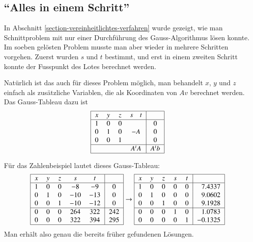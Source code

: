%
%
\subsection{``Alles in einem Schritt''}
In Abschnitt \ref{section-vereinheitlichtes-verfahren} wurde gezeigt,
wie man Schnittproblem mit nur einer Durchführung des Gauss-Algorithmus
lösen konnte.
Im soeben gelösten Problem musste man aber wieder
in mehrere Schritten vorgehen.
Zuerst wurden $s$ und $t$ bestimmt,
und erst in einem zweiten Schritt konnte der Fusspunkt des Lotes
berechnet werden.

Natürlich ist das auch für dieses Problem möglich, man behandelt
$x$, $y$ und $z$ einfach als zusätzliche Variablen, die als Koordinaten
von $Av$ berechnet werden.
Das Gauss-Tableau dazu ist
\[
\begin{tabular}{|>{$}c<{$}>{$}c<{$}>{$}c<{$}>{$}c<{$}|>{$}c<{$}|}
\hline
x&y&z&s\quad t&\\
\hline
1&0&0&        &0\\
0&1&0&-A   &0\\
0&0&1&        &0\\
\hline
 & & &A^tA    &A^tb\\
\hline
\end{tabular}
\]
\begin{beispiel}
Für das Zahlenbeispiel lautet dieses Gauss-Tableau:
\[
\begin{tabular}{|>{$}c<{$}>{$}c<{$}>{$}c<{$}>{$}c<{$}>{$}c<{$}|>{$}c<{$}|}
\hline
x&y&z&s  &  t&\\
\hline
1&0&0& -8& -9&0\\
0&1&0&-10&-13&0\\
0&0&1&-10&-12&0\\
\hline
0&0&0&264&322&242\\
0&0&0&322&394&295\\
\hline
\end{tabular}
\rightarrow
\begin{tabular}{|>{$}c<{$}>{$}c<{$}>{$}c<{$}>{$}c<{$}>{$}c<{$}|>{$}r<{$}|}
\hline
x&y&z&s  &  t&\\
\hline
1&0&0&0&0&7.4337\\
0&1&0&0&0&9.0602\\
0&0&1&0&0&9.1928\\
\hline
0&0&0&1&0&1.0783\\
0&0&0&0&1&-0.1325\\
\hline
\end{tabular}
\]
Man erhält also genau die bereits früher gefundenen Lösungen.
\end{beispiel}

